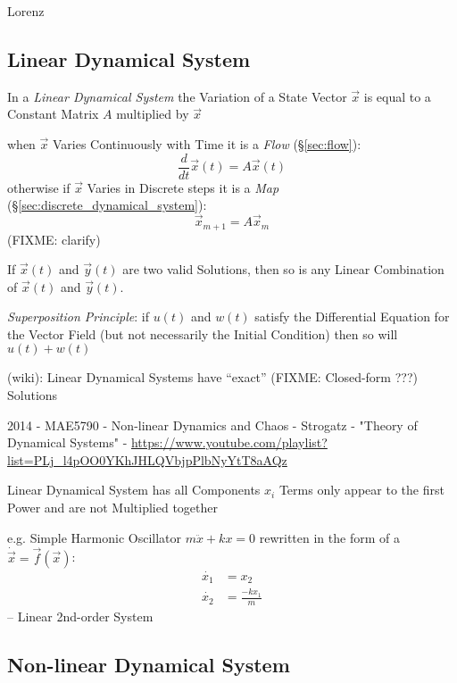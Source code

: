 Lorenz



\subsection{Linear Dynamical System}\label{sec:linear_dynamical_system}

In a \emph{Linear Dynamical System} the Variation of a State Vector $\vec{x}$
is equal to a Constant Matrix $A$ multiplied by $\vec{x}$

when $\vec{x}$ Varies Continuously with Time it is a \emph{Flow}
(\S\ref{sec:flow}):
\[
  \frac{d}{dt}\vec{x}(t) = A\vec{x}(t)
\]
otherwise if $\vec{x}$ Varies in Discrete steps it is a \emph{Map}
(\S\ref{sec:discrete_dynamical_system}):
\[
  \vec{x}_{m+1} = A\vec{x}_m
\]
(FIXME: clarify)

If $\vec{x}(t)$ and $\vec{y}(t)$ are two valid Solutions, then so is any Linear
Combination of $\vec{x}(t)$ and $\vec{y}(t)$.

\emph{Superposition Principle}: if $u(t)$ and $w(t)$ satisfy the Differential
Equation for the Vector Field (but not necessarily the Initial Condition) then
so will $u(t) + w(t)$

(wiki): Linear Dynamical Systems have ``exact'' (FIXME: Closed-form ???)
Solutions

\asterism

2014 - MAE5790 - Non-linear Dynamics and Chaos - Strogatz - "Theory of
Dynamical Systems" -
\url{https://www.youtube.com/playlist?list=PLj_l4pOO0YKhJHLQVbjpPlbNyYtT8aAQz}

Linear Dynamical System has all Components $x_i$ Terms only appear to the first
Power and are not Multiplied together

e.g. Simple Harmonic Oscillator $m\ddot{x} + kx = 0$
rewritten in the form of a $\dot{\vec{x}} = \vec{f}(\vec{x})$:
\begin{align*}
  \dot{x_1} & = x_2 \\
  \dot{x_2} & = \frac{-kx_1}{m}
\end{align*}
-- Linear 2nd-order System



\subsection{Non-linear Dynamical System}\label{sec:nonlinear_dynamical_system}

